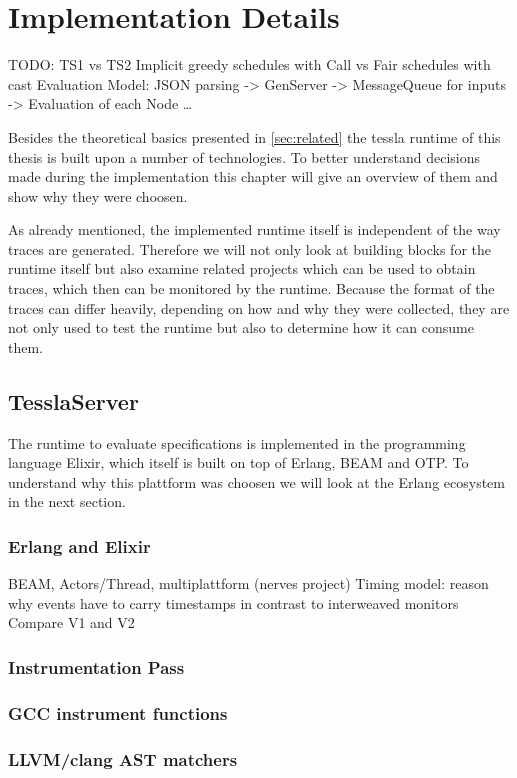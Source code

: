 %
\chapter{Implementation Details}
\label{sec:implementation}

TODO: TS1 vs TS2
      Implicit greedy schedules with Call vs Fair schedules with cast
      Evaluation Model: JSON parsing -> GenServer -> MessageQueue for inputs -> Evaluation of each Node \dots

Besides the theoretical basics presented in \cref{sec:related} the \gls{tessla} runtime of this thesis is built upon a number of technologies.
To better understand decisions made during the implementation this chapter will give an overview of them and show why they were choosen.

As already mentioned, the implemented runtime itself is independent of the way traces are generated.
Therefore we will not only look at building blocks for the runtime itself but also examine related projects which can be used to obtain traces, which then can be monitored by the runtime.
Because the format of the traces can differ heavily, depending on how and why they were collected, they are not only used to test the runtime but also to determine how it can consume them.

\section{TesslaServer}
\label{sec:implementation:tesslaserver}

The runtime to evaluate specifications is implemented in the programming language Elixir, which itself is built on top of Erlang, BEAM and OTP.
To understand why this plattform was choosen we will look at the Erlang ecosystem in the next section.

\subsection{Erlang and Elixir}
\label{sec:implementation:tesslaserver:erlang_elixir}
BEAM, Actors/Thread, multiplattform (nerves project)
Timing model: reason why events have to carry timestamps in contrast to interweaved monitors
Compare V1 and V2

\subsection{Instrumentation Pass}
\label{sec:implementation:instrumentation}


\subsection{GCC instrument functions}
\subsection{LLVM/clang AST matchers}
